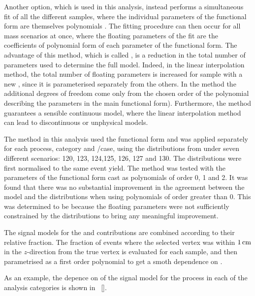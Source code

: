 Another option, which is used in this analysis, instead performs a simultaneous fit of all the different \mH samples, where the individual parameters of the functional form are themselves polynomials \mH. The fitting procedure can then occur for all mass scenarios at once, where the floating parameters of the fit are the coefficients of polynomial form of each parameter of the functional form. The advantage of this method, which is called \SSF, is a reduction in the total number of parameters used to determine the full model. Indeed, in the linear interpolation method, the total number of floating parameters is increased for sample with a new \mH, since it is parameterised separately from the others. In the \SSF method the additional degrees of freedom come only from the chosen order of the polynomial describing the parameters in the main functional form). Furthermore, the \SSF method guarantees a sensible continuous model, where the linear interpolation method can lead to discontinuous or unphysical models. 

The \SSF method in this analysis used the \DCBpG functional form and was applied separately for each process, category and \RV/\WV case, using the \mgg distributions from under seven different \mH scenarios: 120, 123, 124,125, 126, 127 and 130\GeV. The \mgg distributions were first normalised to the same event yield. The \SSF method  was tested with the parameters of the functional form cast as polynomials of order 0, 1 and 2. It was found that there was no substantial improvement in the agreement between the model and the \mgg distributions when using polynomials of order greater than 0. This was determined to be because the floating parameters were not sufficiently constrained by the \mgg distributions to bring any meaningful improvement.

The signal models for the \RV and \WV contributions are combined according to their relative fraction. The fraction of events where the selected vertex was within $1\,\text{cm}$ in the $z$-direction from the true vertex is evaluated for each \mH sample, and then parametrised as a first order polynomial to get a smoth dependence on \mH. 

As an example, the depence on \mH of the signal model for the \ggH process in each of the analysis categories is shown in \Fig~\ref{}. 

